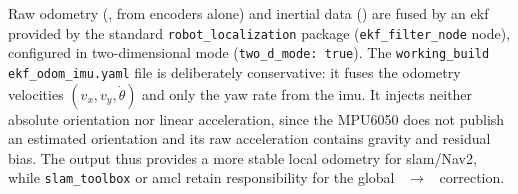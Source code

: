 Raw odometry (, from encoders alone) and inertial data
() are fused by an \gls{ekf} provided by the standard
\texttt{robot\_localization} package (\texttt{ekf\_filter\_node} node), configured in
two-dimensional mode (\texttt{two\_d\_mode: true}). The \texttt{working\_build}
\texttt{ekf\_odom\_imu.yaml} file is deliberately conservative: it fuses the odometry
velocities $(v_x,v_y,\dot\theta)$ and only the yaw rate from the \gls{imu}. It injects
neither absolute orientation nor linear acceleration, since the MPU6050 does not publish
an estimated orientation and its raw acceleration contains gravity and residual bias.
The  output thus provides a more stable local odometry for
\gls{slam}/Nav2, while \texttt{slam\_toolbox} or \gls{amcl} retain responsibility for the
global ~$\rightarrow$~ correction.
